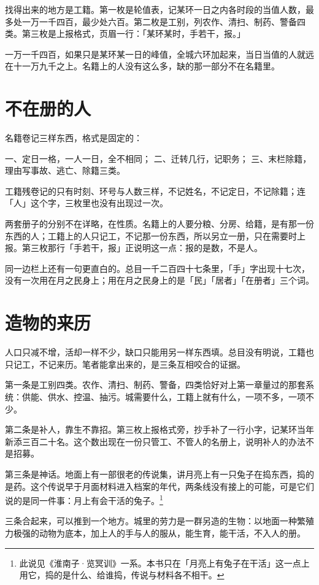 找得出来的地方是工籍。第一枚是轮值表，记某环一日之内各时段的当值人数，最多处一万一千四百，最少处六百。第二枚是工别，列农作、清扫、制药、警备四类。第三枚是上报格式，页眉一行：「某环某时，手若干，报。」

一万一千四百，如果只是某环某一日的峰值，全城六环加起来，当日当值的人就远在十一万九千之上。名籍上的人没有这么多，缺的那一部分不在名籍里。

\section{不在册的人}

名籍卷记三样东西，格式是固定的：

一、定日一格，一人一日，全不相同；
二、迁转几行，记职务；
三、末栏除籍，理由写事故、逃亡、除籍三类。

工籍残卷记的只有时刻、环号与人数三样，不记姓名，不记定日，不记除籍；连「人」这个字，三枚里也没有出现过一次。

两套册子的分别不在详略，在性质。名籍上的人要分粮、分房、给籍，是有那一份东西的人；工籍上的人只记工，不记那一份东西，所以另立一册，只在需要时上报。第三枚那行「手若干，报」正说明这一点：报的是数，不是人。

同一边栏上还有一句更直白的。总目一千二百四十七条里，「手」字出现十七次，没有一次用在月之民身上；用在月之民身上的是「民」「居者」「在册者」三个词。

\section{造物的来历}

人口只减不增，活却一样不少，缺口只能用另一样东西填。总目没有明说，工籍也只记工，不记来历。笔者能拿出来的，是三条互相咬合的证据。

第一条是工别四类。农作、清扫、制药、警备，四类恰好对上第一章量过的那套系统：供能、供水、控温、抽污。城需要什么，工籍上就有什么，一项不多，一项不少。

第二条是补人，靠生不靠招。第三枚上报格式旁，抄手补了一行小字，记某环当年新添三百二十名。这个数出现在一份只管工、不管人的名册上，说明补人的办法不是招募。

第三条是神话。地面上有一部很老的传说集，讲月亮上有一只兔子在捣东西，捣的是药。这个传说早于月面材料进入档案的年代，两条线没有接上的可能，可是它们说的是同一件事：月上有会干活的兔子。\footnote{此说见《淮南子·览冥训》一系。本书只在「月亮上有兔子在干活」这一点上用它，捣的是什么、给谁捣，传说与材料各不相干。}

三条合起来，可以推到一个地方。城里的劳力是一群另造的生物：以地面一种繁殖力极强的动物为底本，加上人的手与人的服从，能生育，能干活，不入人的册。

